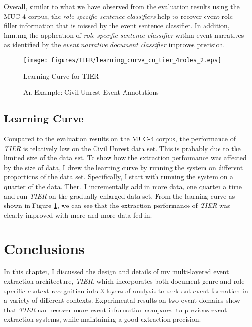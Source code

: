 Overall, similar to what we have observed from the evaluation results using the MUC-4 corpus, 
the {\it role-specific sentence classifiers} 
help to recover event role filler information that is missed by the event sentence classifier. 
In addition, limiting the application of {\it role-specific sentence classifier} 
within event narratives as identified by the {\it event narrative document classifier} 
improves precision.

\begin{figure}[h]
 \centering
 \texttt{[image: figures/TIER/learning\_curve\_cu\_tier\_4roles\_2.eps]}
 \caption{Learning Curve for TIER}
\label{learning_curve_cu_tier}
\end{figure} 


\begin{figure}[htbp]
\center
\caption{An Example: Civil Unrest Event Annotations}
\label{annotation-cu-role-sample-withDoc}
\end{figure}


\subsection{Learning Curve}
\label{tier:lcurve}

Compared to the evaluation results on the MUC-4 corpus, 
the performance of {\it TIER} is relatively low on the Civil Unrest data set. 
This is prabably due to the limited size of the data set. 
To show how the extraction performance was affected by the size of data, 
I drew the learning curve 
by running the system on different proportions of the data set.
Specifically, I start with running the system on a quarter of the data. 
Then, I incrementally add in more data, one quarter a time and run {\it TIER} 
on the gradually enlarged data set. 
From the learning curve as shown in Figure \ref{learning_curve_cu_tier}, 
we can see that the extraction performance of {\it TIER} was clearly improved 
with more and more data fed in. 


\section{Conclusions}

In this chapter, I discussed the design and details of 
my multi-layered event extraction architecture, {\it TIER}, 
which incorporates both document genre
and role-specific context recognition into 3 layers of analysis 
to seek out event formation in a variety of different contexts. 
Experimental results on two event domains show that {\it TIER} 
can recover more event information compared to previous 
event extraction systems, while maintaining a good extraction precision.

